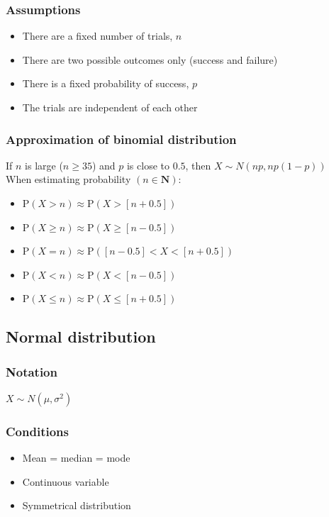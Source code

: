 \documentclass[A4paper]{article}
\begin{document}
	\subsubsection{Assumptions}
	\begin{itemize}
		\item There are a fixed number of trials, $n$
		\item There are two possible outcomes only (success and failure)
		\item There is a fixed probability of success, $p$
		\item The trials are independent of each other
	\end{itemize}
	\subsubsection{Approximation of binomial distribution}
	If $n$ is large ($n\geq35$) and $p$ is close to $0.5$, then $X \sim N(np, np(1-p))$\\
	When estimating probability $(n\in \textbf{N})$:
	\begin{itemize}
		\item $\text{P}(X>n)\approx \text{P}(X>[n+0.5])$
		\item $\text{P}(X\geq n)\approx \text{P}(X\geq [n-0.5])$
		\item $\text{P}(X=n)\approx \text{P}([n-0.5]<X<[n+0.5])$
		\item $\text{P}(X<n)\approx \text{P}(X<[n-0.5])$
		\item $\text{P}(X \leq n)\approx \text{P}(X\leq [n+0.5])$
	\end{itemize}
	
	\subsection{Normal distribution}
	\subsubsection{Notation}
	$X \sim N(\mu,\sigma^2)$
	\subsubsection{Conditions}
	\begin{itemize}
		\item Mean = median = mode
		\item Continuous variable
		\item Symmetrical distribution
	\end{itemize}
\end{document}
